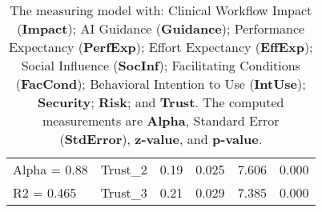 \begin{table}
{\begin{tabular}{llrrrl}
Alpha = 0.88                & Trust\_2    & 0.19                      & 0.025                        & 7.606                       & 0.000   \\
R2 = 0.465                  & Trust\_3    & 0.21                      & 0.029                        & 7.385                       & 0.000  \\ \hline
\end{tabular}%
}
\caption{The measuring model with: Clinical Workflow Impact ({\bf Impact}); AI Guidance ({\bf Guidance}); Performance Expectancy ({\bf PerfExp}); Effort Expectancy ({\bf EffExp}); Social Influence ({\bf SocInf}); Facilitating Conditions ({\bf FacCond}); Behavioral Intention to Use ({\bf IntUse}); {\bf Security}; {\bf Risk}; and {\bf Trust}. The computed measurements are {\bf Alpha}, Standard Error ({\bf StdError}), {\bf z-value}, and {\bf p-value}.}
\label{tab:tab010}
\end{table}